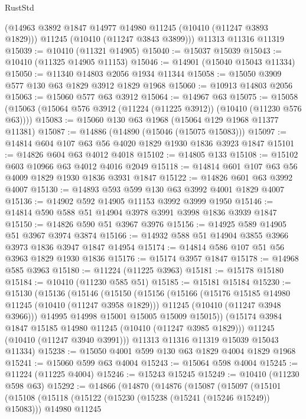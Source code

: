 \begin{lexlean}{RustStd}
\begin{coremodule}
      (@14963 @3892 @1847 @14977 @14980 @11245 (@10410 (@11247 @3893 @1829)))
      @11245
      (@10410 (@11247 @3843 @3899)))
    @11313
    @11316
    @11319
@15039 := @10410 (@11321 @14905)
@15040 := @15037 @15039
@15043 := @10410 (@11325 @14905 @11153)
@15046 := @14901 (@15040 @15043 @11334)
@15050 := @11340 @14803 @2056 @1934 @11344
@15058 := @15050 @3909 @577 @130 @63 @1829 @3912 @1829 @1968
@15060 := @10913 @14803 @2056
@15063 := @15060 @577 @63 @3912
@15064 := @14967 @63
@15075 := @15058 (@15063 (@15064 @576 @3912 (@11224 (@11225 @3912)) (@10410 (@11230 @576 @63))))
@15083 := @15060 @130 @63 @1968 (@15064 @129 @1968 @11377 @11381)
@15087 := @14886 (@14890 (@15046 (@15075 @15083)))
@15097 := @14814 @604 @107 @63 @56 @4020 @1829 @1930 @1836 @3923 @1847
@15101 := @14826 @604 @63 @4012 @4018
@15102 := @14805 @133
@15108 := @15102 @603 @10966 @63 @4012 @4016 @2049
@15118 := @14814 @601 @107 @63 @56 @4009 @1829 @1930 @1836 @3931 @1847
@15122 := @14826 @601 @63 @3992 @4007
@15130 := @14893 @593 @599 @130 @63 @3992 @4001 @1829 @4007
@15136 := @14902 @592 @14905 @11153 @3992 @3999 @1950
@15146 := @14814 @590 @588 @51 @14904 @3978 @3991 @3998 @1836 @3939 @1847
@15150 := @14826 @590 @51 @3967 @3976
@15156 := @14925 @589 @14905 @51 @3967 @3974 @3874
@15166 := @14932 @588 @51 @14904 @3855 @3966 @3973 @1836 @3947 @1847 @14954
@15174 := @14814 @586 @107 @51 @56 @3963 @1829 @1930 @1836
@15176 := @15174 @3957 @1847
@15178 := @14968 @585 @3963
@15180 := @11224 (@11225 @3963)
@15181 := @15178 @15180
@15184 := @10410 (@11230 @585 @51)
@15185 := @15181 @15184
@15230 := @15130
    (@15136
      (@15146
        (@15150
          (@15156
            (@15166
              (@15176 @15185 @14980 @11245 (@10410 (@11247 @3958 @1829)))
              @11245
              (@10410 (@11247 @3948 @3966)))
            @14995
            @14998
            @15001
            @15005
            @15009
            @15015))
        (@15174 @3984 @1847 @15185 @14980 @11245 (@10410 (@11247 @3985 @1829)))
        @11245
        (@10410 (@11247 @3940 @3991)))
      @11313
      @11316
      @11319
      @15039
      @15043
      @11334)
@15238 := @15050 @4001 @599 @130 @63 @1829 @4004 @1829 @1968
@15241 := @15060 @599 @63 @4004
@15243 := @15064 @598 @4004
@15245 := @11224 (@11225 @4004)
@15246 := @15243 @15245
@15249 := @10410 (@11230 @598 @63)
@15292 := @14866
    (@14870
      (@14876
        (@15087
          (@15097
            (@15101
              (@15108
                (@15118
                  (@15122 (@15230 (@15238 (@15241 (@15246 @15249)) @15083)))
                  @14980
                  @11245

\end{coremodule}
\end{lexlean}
